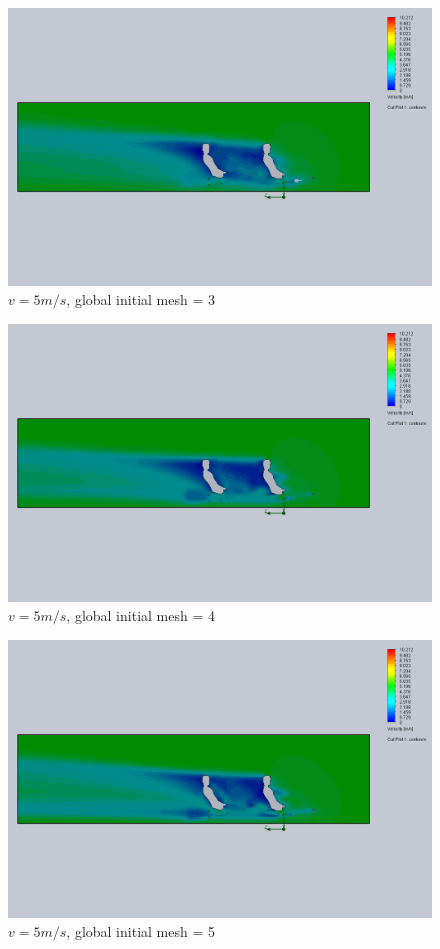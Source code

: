 \documentclass[11pt]{article}
\begin{document}
\begin{figure}
\includegraphics[width=\textwidth]{gm_3_rf_7_v05.png}
\caption{$v = 5 m/s$, global initial mesh = 3}
\end{figure}

\begin{figure}
\includegraphics[width=\textwidth]{gm_4_rf_7_v05.png}
\caption{$v = 5 m/s$, global initial mesh = 4}
\end{figure}

\begin{figure}
\includegraphics[width=\textwidth]{gm_5_rf_7_v05.png}
\caption{$v = 5 m/s$, global initial mesh = 5}
\end{figure}
\end{document}
